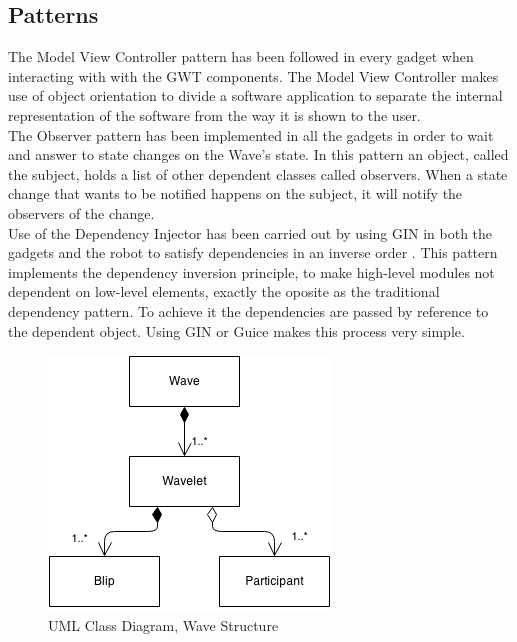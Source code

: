 \subsection{Patterns}
The Model View Controller pattern has been followed in every gadget when interacting with with the GWT components. The Model View Controller makes use of object orientation to divide a software application to separate the internal representation of the software from the way it is shown to the user.\\[.2cm]
The Observer pattern has been implemented in all the gadgets in order to wait and answer to state changes on the Wave's state. In this pattern an object, called the subject, holds a list of other dependent classes called observers. When a state change that wants to be notified happens on the subject, it will notify the observers of the change.\\[.2cm]
Use of the Dependency Injector has been carried out by using GIN in both the gadgets and the robot to satisfy dependencies in an inverse order \cite{ref:dependency_injection}. This pattern implements the dependency inversion principle, to make high-level modules not dependent on low-level elements, exactly the oposite as the traditional dependency pattern. To achieve it the dependencies are passed by reference to the dependent object. Using GIN or Guice makes this process very simple.
\begin{figure}[h]
  \center
    \includegraphics[keepaspectratio, scale=0.7]{Media/Diagrams/Wave/Structure.png}
  \caption{UML Class Diagram, Wave Structure}
  \label{fig:wave_structure}
\end{figure}
